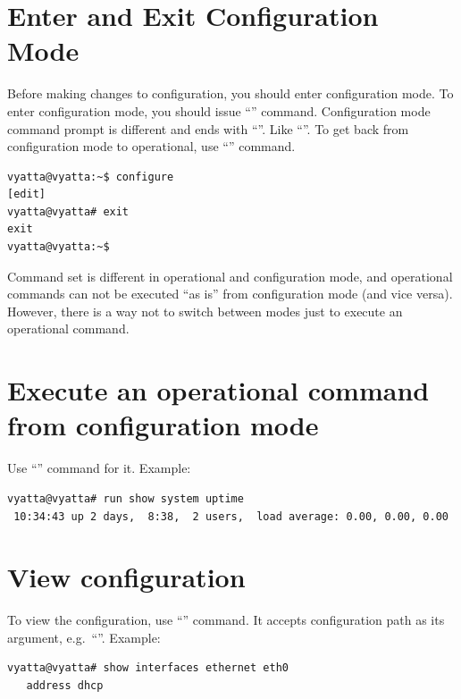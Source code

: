 \section{Enter and Exit Configuration Mode}
\solution
Before making changes to configuration, you should enter configuration mode. To enter configuration mode, 
you should issue ``'' command. Configuration mode command prompt is
different and ends with ``\console{\#}''. Like ``''. To get back from configuration
mode to operational, use ``'' command.
\begin{verbatim}
vyatta@vyatta:~$ configure 
[edit]
vyatta@vyatta# exit
exit
vyatta@vyatta:~$ 
\end{verbatim}

Command set is different in operational and configuration mode, and operational commands can not be executed
``as is'' from configuration mode (and vice versa). However, there is a way not to switch between modes just to
execute an operational command.

\section{Execute an operational command from configuration mode}
\solution
Use ``'' command for it. Example:
\begin{verbatim}
vyatta@vyatta# run show system uptime 
 10:34:43 up 2 days,  8:38,  2 users,  load average: 0.00, 0.00, 0.00
\end{verbatim}

\section{View configuration}
\solution
To view the configuration, use ``'' command. It accepts configuration path as its argument, 
e.g.~``''. Example:
\begin{verbatim}
vyatta@vyatta# show interfaces ethernet eth0
   address dhcp
\end{verbatim}

